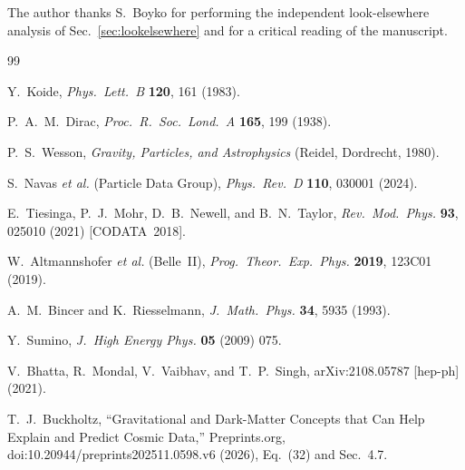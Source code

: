 \documentclass[aps,prd,preprint,amsmath,amssymb,nofootinbib]{revtex4-2}
\begin{document}
\begin{acknowledgments}
The author thanks S.~Boyko for performing the independent look-elsewhere
analysis of Sec.~\ref{sec:lookelsewhere} and for a critical reading of the
manuscript.
\end{acknowledgments}

\begin{thebibliography}{99}

 Y.~Koide,
\textit{Phys.\ Lett.\ B} \textbf{120}, 161 (1983).

 P.~A.~M.~Dirac,
\textit{Proc.\ R.\ Soc.\ Lond.\ A} \textbf{165}, 199 (1938).

 P.~S.~Wesson,
\textit{Gravity, Particles, and Astrophysics} (Reidel, Dordrecht, 1980).

 S.~Navas \textit{et al.} (Particle Data Group),
\textit{Phys.\ Rev.\ D} \textbf{110}, 030001 (2024).

 E.~Tiesinga, P.~J.~Mohr, D.~B.~Newell, and B.~N.~Taylor,
\textit{Rev.\ Mod.\ Phys.} \textbf{93}, 025010 (2021) [CODATA~2018].

 W.~Altmannshofer \textit{et al.} (Belle~II),
\textit{Prog.\ Theor.\ Exp.\ Phys.} \textbf{2019}, 123C01 (2019).

 A.~M.~Bincer and K.~Riesselmann,
\textit{J.\ Math.\ Phys.} \textbf{34}, 5935 (1993).

 Y.~Sumino,
\textit{J.\ High Energy Phys.} \textbf{05} (2009) 075.

 V.~Bhatta, R.~Mondal, V.~Vaibhav, and T.~P.~Singh,
arXiv:2108.05787 [hep-ph] (2021).

 T.~J.~Buckholtz, ``Gravitational and Dark-Matter
Concepts that Can Help Explain and Predict Cosmic Data,'' Preprints.org,
doi:10.20944/preprints202511.0598.v6 (2026), Eq.~(32) and Sec.~4.7.

\end{thebibliography}
\end{document}
